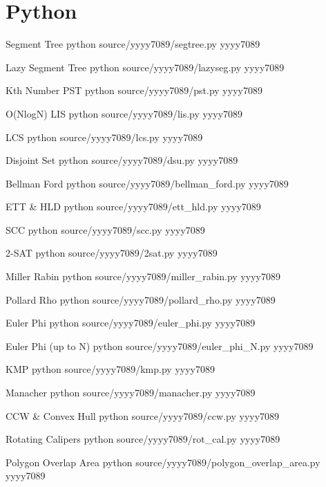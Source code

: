 \documentclass[landscape, 10pt, a4paper, oneside, twocolumn]{extarticle}
\begin{document}
\maketitlepage



\section{Python}

\Algorithm
{Segment Tree}
{}
{}
{python}
{source/yyyy7089/segtree.py}
{yyyy7089}

\Algorithm
{Lazy Segment Tree}
{}
{}
{python}
{source/yyyy7089/lazyseg.py}
{yyyy7089}

\Algorithm
{Kth Number PST}
{}
{}
{python}
{source/yyyy7089/pst.py}
{yyyy7089}

\Algorithm
{O(NlogN) LIS}
{}
{}
{python}
{source/yyyy7089/lis.py}
{yyyy7089}

\Algorithm
{LCS}
{}
{}
{python}
{source/yyyy7089/lcs.py}
{yyyy7089}

\Algorithm
{Disjoint Set}
{}
{}
{python}
{source/yyyy7089/dsu.py}
{yyyy7089}

\Algorithm
{Bellman Ford}
{}
{}
{python}
{source/yyyy7089/bellman_ford.py}
{yyyy7089}

\Algorithm
{ETT \& HLD}
{}
{}
{python}
{source/yyyy7089/ett_hld.py}
{yyyy7089}

\Algorithm
{SCC}
{}
{}
{python}
{source/yyyy7089/scc.py}
{yyyy7089}

\Algorithm
{2-SAT}
{}
{}
{python}
{source/yyyy7089/2sat.py}
{yyyy7089}

\Algorithm
{Miller Rabin}
{}
{}
{python}
{source/yyyy7089/miller_rabin.py}
{yyyy7089}

\Algorithm
{Pollard Rho}
{}
{}
{python}
{source/yyyy7089/pollard_rho.py}
{yyyy7089}

\Algorithm
{Euler Phi}
{}
{}
{python}
{source/yyyy7089/euler_phi.py}
{yyyy7089}

\Algorithm
{Euler Phi (up to N)}
{}
{}
{python}
{source/yyyy7089/euler_phi_N.py}
{yyyy7089}

\Algorithm
{KMP}
{}
{}
{python}
{source/yyyy7089/kmp.py}
{yyyy7089}

\Algorithm
{Manacher}
{}
{}
{python}
{source/yyyy7089/manacher.py}
{yyyy7089}

\Algorithm
{CCW \& Convex Hull}
{}
{}
{python}
{source/yyyy7089/ccw.py}
{yyyy7089}

\Algorithm
{Rotating Calipers}
{}
{}
{python}
{source/yyyy7089/rot_cal.py}
{yyyy7089}

\Algorithm
{Polygon Overlap Area}
{}
{}
{python}
{source/yyyy7089/polygon_overlap_area.py}
{yyyy7089}
\end{document}
